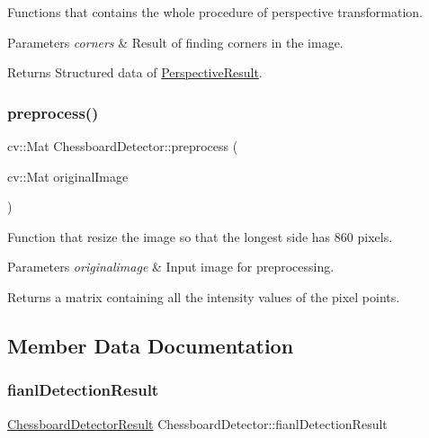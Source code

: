Functions that contains the whole procedure of perspective transformation. 


\begin{DoxyParams}{Parameters}
{\em corners} & Result of finding corners in the image. \\
\hline
\end{DoxyParams}
\begin{DoxyReturn}{Returns}
Structured data of \hyperlink{struct_perspective_result}{Perspective\+Result}. 
\end{DoxyReturn}
\mbox{\label{class_chessboard_detector_a5860832e43410d526daf7415e5775aa9}} 
\subsubsection{\texorpdfstring{preprocess()}{preprocess()}}
{\footnotesize\ttfamily cv\+::\+Mat Chessboard\+Detector\+::preprocess (\begin{DoxyParamCaption}\item[{cv\+::\+Mat}]{original\+Image }\end{DoxyParamCaption})}



Function that resize the image so that the longest side has 860 pixels. 


\begin{DoxyParams}{Parameters}
{\em originalimage} & Input image for preprocessing. \\
\hline
\end{DoxyParams}
\begin{DoxyReturn}{Returns}
a matrix containing all the intensity values of the pixel points. 
\end{DoxyReturn}


\subsection{Member Data Documentation}
\mbox{\label{class_chessboard_detector_a0694ee14ff2ca2e9c0a815fd18f321cd}} 
\subsubsection{\texorpdfstring{fianl\+Detection\+Result}{fianlDetectionResult}}
{\footnotesize\ttfamily \hyperlink{struct_chessboard_detector_result}{Chessboard\+Detector\+Result} Chessboard\+Detector\+::fianl\+Detection\+Result\hspace{0.3cm}{\ttfamily [private]}}


